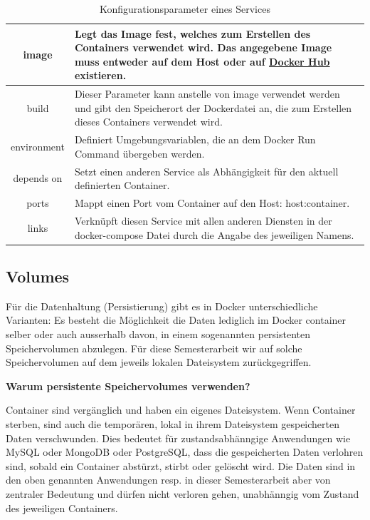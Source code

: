 \begin{table}[H]
	\centering
		\begin{tabular}{c|p{12cm}}
			image & Legt das Image fest, welches zum Erstellen des Containers verwendet wird. Das angegebene Image muss 
			entweder auf dem Host oder auf  \href{https://hub.docker.com}{Docker Hub} existieren. \\ \midrule
			build & Dieser Parameter kann anstelle von image verwendet werden und gibt den Speicherort der Dockerdatei an,
			die zum Erstellen dieses Containers verwendet wird.\\ \midrule
			environment & Definiert Umgebungsvariablen, die an dem Docker Run Command {\"u}bergeben werden.\\ \midrule
			depends on & Setzt einen anderen Service als Abh{\"a}ngigkeit f{\"u}r den aktuell definierten Container.\\ \midrule
			ports & Mappt einen Port vom Container auf den Host: host:container.\\ \midrule
			links & Verkn{\"u}pft diesen Service mit allen anderen Diensten in der docker-compose Datei durch die Angabe 
			des jeweiligen Namens. \\ \bottomrule
		\end{tabular}
	\caption{Konfigurationsparameter eines Services}
	\label{tab:services}
\end{table}

\subsection{Volumes}
\label{sec:volumes}

F{\"u}r die Datenhaltung (Persistierung) gibt es in Docker unterschiedliche Varianten: Es besteht die M{\"o}glichkeit die Daten lediglich im Docker container selber oder auch ausserhalb davon, in einem sogenannten persistenten Speichervolumen abzulegen. F{\"u}r diese Semesterarbeit wir auf solche Speichervolumen auf dem jeweils lokalen Dateisystem zur{\"u}ckgegriffen. 

\textbf{Warum persistente Speichervolumes verwenden?}

Container sind verg{\"a}nglich und haben ein eigenes Dateisystem.  Wenn Container sterben, sind auch die tempor{\"a}ren, lokal in ihrem Dateisystem gespeicherten Daten verschwunden. Dies bedeutet f{\"u}r zustandsabh{\"a}nngige Anwendungen wie MySQL oder MongoDB oder PostgreSQL, dass die gespeicherten Daten verlohren sind, sobald ein Container abst{\"u}rzt, stirbt oder gel{\"o}scht wird. Die Daten sind in den oben genannten Anwendungen resp. in dieser Semesterarbeit aber von zentraler Bedeutung und d{\"u}rfen nicht verloren gehen, unabh{\"a}nngig vom Zustand des jeweiligen Containers.

